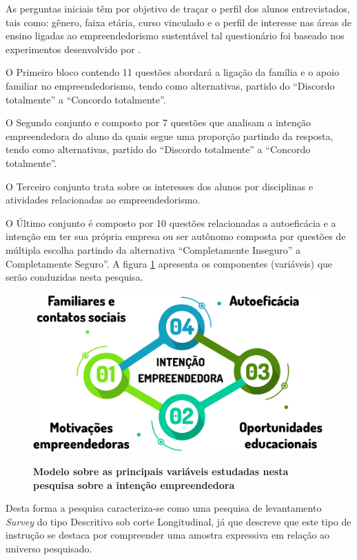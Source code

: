 As perguntas iniciais têm por objetivo de traçar o perfil dos alunos entrevistados, tais como: gênero, faixa etária, curso vinculado e o perfil de interesse nas áreas de ensino ligadas ao empreendedorismo sustentável tal questionário foi baseado nos experimentos desenvolvido por . 


O Primeiro bloco contendo 11 questões abordará a ligação da família e o apoio familiar no empreendedorismo, tendo como alternativas, partido do “Discordo totalmente” a “Concordo totalmente”.

O Segundo conjunto e composto por 7 questões que analisam a intenção empreendedora do aluno da quais segue uma proporção partindo da resposta, tendo como alternativas, partido do “Discordo totalmente” a “Concordo totalmente”.

O Terceiro conjunto trata sobre os interesses dos alunos por disciplinas e atividades relacionadas ao empreendedorismo.

O Último conjunto é composto por 10 questões relacionadas a autoeficácia e a intenção em ter sua própria empresa ou ser autônomo composta por questões de múltipla escolha partindo da alternativa “Completamente Inseguro” a Completamente Seguro”. A figura \ref{figura_9} apresenta os componentes (variáveis) que serão conduzidas nesta pesquisa.


\begin{figure}[!htb]
\centering
\caption{\textbf{Modelo sobre as principais variáveis estudadas nesta pesquisa sobre a intenção empreendedora}}
\includegraphics[scale=0.4]{Imagens/intencao_empreendedora.png}
\label{figura_9}
\end{figure}

Desta forma a pesquisa caracteriza-se como uma pesquisa de levantamento \textit{Survey} do tipo Descritivo sob corte Longitudinal, já que  descreve que este tipo de instrução se destaca por compreender uma amostra expressiva em relação ao universo pesquisado. 

